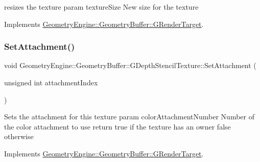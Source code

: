 resizes the texture param texture\+Size New size for the texture 

Implements \mbox{\hyperlink{class_geometry_engine_1_1_geometry_buffer_1_1_g_render_target_ac1e54f456408b53de44fe10116d649dd}{Geometry\+Engine\+::\+Geometry\+Buffer\+::\+G\+Render\+Target}}.

\mbox{\label{class_geometry_engine_1_1_geometry_buffer_1_1_g_depth_stencil_texture_aa4b676746b13f4ea748450ea19ca711a}} 
\subsubsection{\texorpdfstring{SetAttachment()}{SetAttachment()}\hspace{0.1cm}{\footnotesize\ttfamily [1/2]}}
{\footnotesize\ttfamily void Geometry\+Engine\+::\+Geometry\+Buffer\+::\+G\+Depth\+Stencil\+Texture\+::\+Set\+Attachment (\begin{DoxyParamCaption}\item[{unsigned int}]{attachment\+Index }\end{DoxyParamCaption})\hspace{0.3cm}{\ttfamily [virtual]}}

Sets the attachment for this texture param color\+Attachment\+Number Number of the color attachment to use return true if the texture has an owner false otherwise 

Implements \mbox{\hyperlink{class_geometry_engine_1_1_geometry_buffer_1_1_g_render_target_a1031c44ad374654e2183d3b1b99638a3}{Geometry\+Engine\+::\+Geometry\+Buffer\+::\+G\+Render\+Target}}.

\mbox{\label{class_geometry_engine_1_1_geometry_buffer_1_1_g_depth_stencil_texture_ae8d0ace073861e957f5abe264d2c321d}} 
